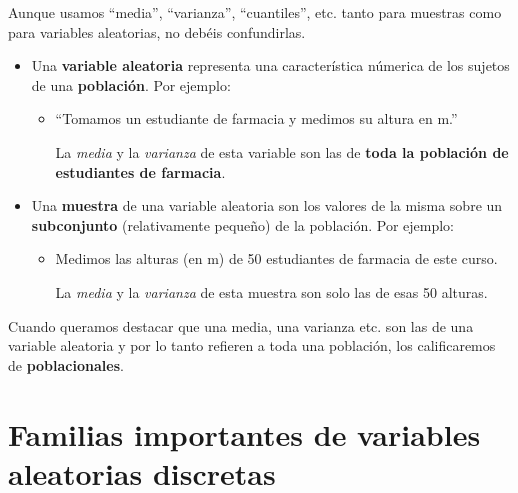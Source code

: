 \documentclass[
  spanish,
  letterpaper,
  DIV=11,
  numbers=noendperiod]{scrreprt}
\begin{document}
\begin{tcolorbox}[enhanced jigsaw, arc=.35mm, bottomrule=.15mm, bottomtitle=1mm, breakable, colback=white, colbacktitle=quarto-callout-warning-color!10!white, colframe=quarto-callout-warning-color-frame, coltitle=black, left=2mm, leftrule=.75mm, opacityback=0, opacitybacktitle=0.6, rightrule=.15mm, title=\textcolor{quarto-callout-warning-color}{\faExclamationTriangle}\hspace{0.5em}{Advertencia}, titlerule=0mm, toprule=.15mm, toptitle=1mm]

Aunque usamos ``media'', ``varianza'', ``cuantiles'', etc. tanto para
muestras como para variables aleatorias, no debéis confundirlas.

\begin{itemize}
\item
  Una \textbf{variable aleatoria} representa una característica númerica
  de los sujetos de una \textbf{población}. Por ejemplo:

  \begin{itemize}
  \item
    ``Tomamos un estudiante de farmacia y medimos su altura en m.''

    La \emph{media} y la \emph{varianza} de esta variable son las de
    \textbf{toda la población de estudiantes de farmacia}.
  \end{itemize}
\item
  Una \textbf{muestra} de una variable aleatoria son los valores de la
  misma sobre un \textbf{subconjunto} (relativamente pequeño) de la
  población. Por ejemplo:

  \begin{itemize}
  \item
    Medimos las alturas (en m) de 50 estudiantes de farmacia de este
    curso.

    La \emph{media} y la \emph{varianza} de esta muestra son solo las de
    esas 50 alturas.
  \end{itemize}
\end{itemize}

\end{tcolorbox}

Cuando queramos destacar que una media, una varianza etc. son las de una
variable aleatoria y por lo tanto refieren a toda una población, los
calificaremos de \textbf{poblacionales}.

\section{Familias importantes de variables aleatorias
discretas}\label{familias-importantes-de-variables-aleatorias-discretas}
\end{document}
